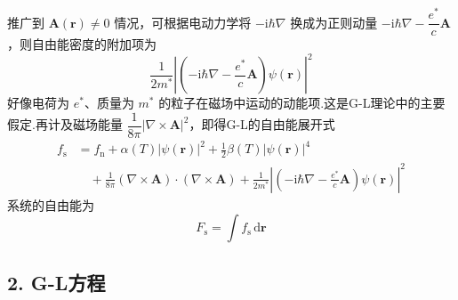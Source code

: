 推广到 $\boldsymbol{A}(\boldsymbol{r})\neq0$ 情况，可根据电动力学将 $-\mathrm{i}\hbar\nabla$ 换成为正则动量 $-\mathrm{i}\hbar\nabla-\dfrac{e^{*}}{c}\boldsymbol{A}$，则自由能密度的附加项为
\begin{equation*}
  \frac{1}{2m^{*}}\left|\left(-\mathrm{i}\hbar\nabla
  -\frac{e^{*}}{c}\boldsymbol{A}\right)\psi(\boldsymbol{r})\right|^{2}
\end{equation*}
好像电荷为 $e^{*}$、质量为 $m^{*}$ 的粒子在磁场中运动的动能项.这是G-L理论中的主要假定.再计及磁场能量 $\dfrac{1}{8\pi}|\nabla\times\boldsymbol{A}|^{2}$，即得G-L的自由能展开式
\begin{equation}
\begin{aligned}
  f_{\mathrm{s}}&=f_{\mathrm{n}}+\alpha(T)|\psi(\boldsymbol{r})|^{2}
  +\frac{1}{2}\beta(T)|\psi(\boldsymbol{r})|^{4}\\
  &\quad+\frac{1}{8\pi}\left(\nabla\times\boldsymbol{A}\right)
  \cdot\left(\nabla\times\boldsymbol{A}\right)
  +\frac{1}{2m^{*}}\left|\left(-\mathrm{i}\hbar\nabla
  -\frac{e^{*}}{c}\boldsymbol{A}\right)\psi(\boldsymbol{r})\right|^{2}
\end{aligned}
\end{equation}
系统的自由能为
\begin{equation}
  F_{\mathrm{s}}=\int f_{\mathrm{s}}\,\mathrm{d}\boldsymbol{r}
\end{equation}

\subsection*{2. G-L方程}

